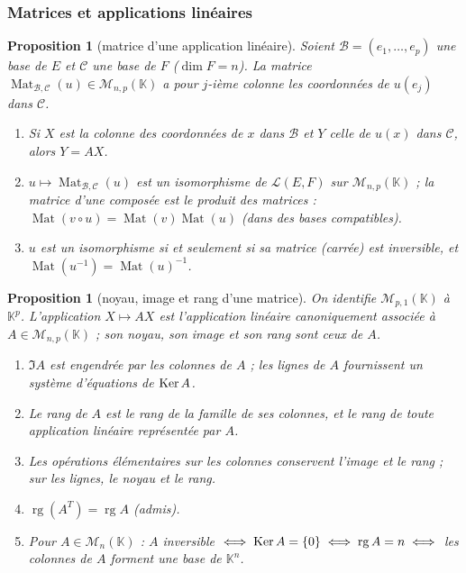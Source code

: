 \documentclass[a4paper,11pt]{article}
\numberwithin{equation}{section}
\numberwithin{figure}{section}
\numberwithin{table}{section}
\theoremstyle{enonce}
\newtheorem{proposition}[definition]{Proposition}
\theoremstyle{exemple}
\theoremstyle{remarque}
\newcommand{\K}{\mathbb{K}}
\newcommand{\Mn}[1]{\mathcal{M}_{n}(#1)}
\newcommand{\rg}{\operatorname{rg}}
\newcommand{\Mat}{\operatorname{Mat}}
\begin{document}
\subsubsection*{Matrices et applications linéaires}

\begin{proposition}[matrice d'une application linéaire]\label{r:matrice}
Soient $\mathcal B=(e_1,\dots,e_p)$ une base de $E$ et $\mathcal C$ une base de $F$ ($\dim F=n$). La matrice
$\Mat_{\mathcal B,\mathcal C}(u)\in\mathcal M_{n,p}(\K)$ a pour $j$-ième colonne les coordonnées de $u(e_j)$ dans $\mathcal C$.
\begin{enumerate}
\item Si $X$ est la colonne des coordonnées de $x$ dans $\mathcal B$ et $Y$ celle de $u(x)$ dans $\mathcal C$, alors $Y=AX$.
\item $u\mapsto\Mat_{\mathcal B,\mathcal C}(u)$ est un isomorphisme de $\mathcal L(E,F)$ sur $\mathcal M_{n,p}(\K)$ ; la matrice d'une
composée est le produit des matrices : $\Mat(v\circ u)=\Mat(v)\Mat(u)$ (dans des bases compatibles).
\item $u$ est un isomorphisme si et seulement si sa matrice (carrée) est inversible, et $\Mat(u^{-1})=\Mat(u)^{-1}$.
\end{enumerate}
\end{proposition}

\begin{proposition}[noyau, image et rang d'une matrice]\label{r:rang-matrice}
On identifie $\mathcal M_{p,1}(\K)$ à $\K^p$. L'application $X\mapsto AX$ est l'application linéaire \emph{canoniquement
associée} à $A\in\mathcal M_{n,p}(\K)$ ; son noyau, son image et son rang sont ceux de $A$.
\begin{enumerate}
\item $\Im A$ est engendrée par les colonnes de $A$ ; les lignes de $A$ fournissent un système d'équations de $\operatorname{Ker} A$.
\item Le rang de $A$ est le rang de la famille de ses colonnes, et le rang de toute application linéaire représentée par $A$.
\item Les opérations élémentaires sur les colonnes conservent l'image et le rang ; sur les lignes, le noyau et le rang.
\item $\rg(A^T)=\rg A$ (admis).
\item Pour $A\in\Mn{\K}$ : $A$ inversible $\iff\Ker A=\{0\}\iff\rg A=n\iff$ les colonnes de $A$ forment une base de $\K^n$.
\end{enumerate}
\end{proposition}
\end{document}
